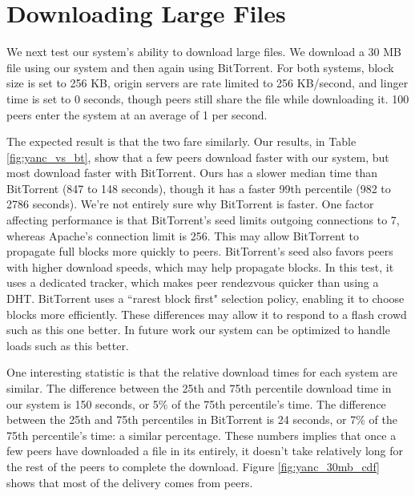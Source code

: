 \section{Downloading Large Files}

We next test our system's ability to download large files. We download a 30 MB file using our system and then again using BitTorrent.
For both systems, block size is set to 256 KB, origin servers are rate limited to 256 KB/second, and linger time 
is set to 0 seconds, though peers still share the file while downloading it. 100 peers enter the system at an average of 1 per second.  

The expected result is that the two fare similarly.  Our results, in Table \ref{fig:yanc_vs_bt}, show that a few peers download 
faster with our system, but most download faster with BitTorrent. 
Ours has a slower median time than BitTorrent (847 to 148 seconds), though it has a faster 99th
percentile (982 to 2786 seconds). We're not entirely sure why BitTorrent is faster.  
One factor affecting performance is that BitTorrent's seed limits outgoing connections to 7, whereas Apache's connection limit is 256.
This may allow BitTorrent to propagate full blocks more quickly to peers.  BitTorrent's seed also favors peers with higher download 
speeds, which may help propagate blocks.  In this test, it uses a dedicated tracker, 
which makes peer rendezvous quicker than using a DHT.  BitTorrent uses a ``rarest block first" selection policy, 
enabling it to choose blocks more efficiently.  
These differences may allow it to respond to a flash crowd such as this one better.  
In future work our system can be optimized to handle loads such as this better.

One interesting statistic is that the relative download times for each system are similar.
The difference between the 25th and 75th percentile download time in our system is 150 seconds, 
or 5\% of the 75th percentile's time. The difference between the 25th and 75th percentiles in BitTorrent 
is 24 seconds, or 7\% of the 75th percentile's time: a similar percentage. These numbers implies that once 
a few peers have downloaded a file in its entirely, it doesn't take relatively long for the rest of the peers to complete 
the download.  Figure \ref{fig:yanc_30mb_cdf} shows that most of the delivery comes from peers.


